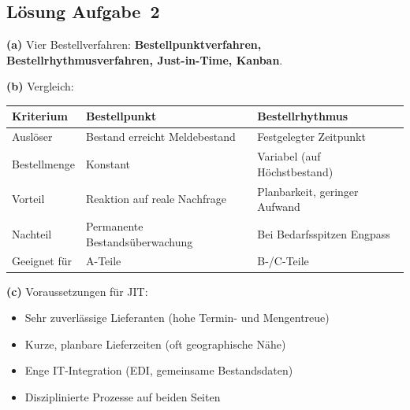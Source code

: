 \documentclass[11pt, a4paper]{article}
\begin{document}
\subsection*{Lösung Aufgabe~2}
\begin{loesung}
\textbf{(a)} Vier Bestellverfahren: \textbf{Bestellpunktverfahren, Bestellrhythmus\-verfahren,
Just-in-Time, Kanban}.

\textbf{(b)} Vergleich:

\begin{center}
\begin{tabular}{p{4cm} p{4.5cm} p{4.5cm}}
\toprule
\textbf{Kriterium} & \textbf{Bestellpunkt} & \textbf{Bestellrhythmus}\\
\midrule
Auslöser & Bestand erreicht Meldebestand & Festgelegter Zeitpunkt\\
Bestellmenge & Konstant & Variabel (auf Höchstbestand)\\
Vorteil & Reaktion auf reale Nachfrage & Planbarkeit, geringer Aufwand\\
Nachteil & Permanente Bestandsüberwachung & Bei Bedarfsspitzen Engpass\\
Geeignet für & A-Teile & B-/C-Teile\\
\bottomrule
\end{tabular}
\end{center}

\textbf{(c)} Voraussetzungen für JIT:
\begin{itemize}[itemsep=0pt]
  \item Sehr zuverlässige Lieferanten (hohe Termin- und Mengentreue)
  \item Kurze, planbare Lieferzeiten (oft geographische Nähe)
  \item Enge IT-Integration (EDI, gemeinsame Bestandsdaten)
  \item Disziplinierte Prozesse auf beiden Seiten
\end{itemize}
\end{loesung}
\end{document}
